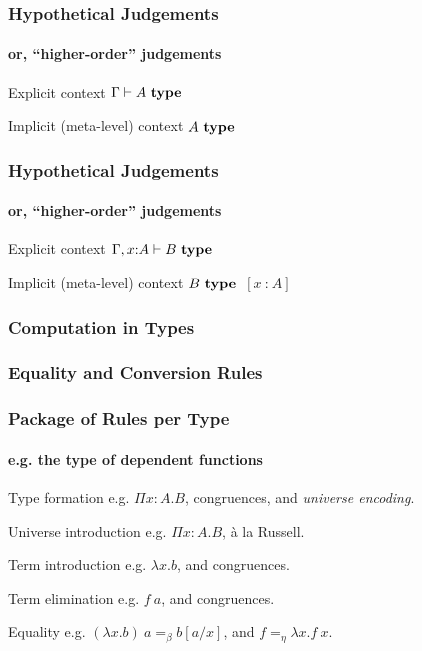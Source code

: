 \documentclass[mathserif]{beamer}
\newcommand{\istype}[1]{\ensuremath{#1 ~\textbf{\textrm{type}}}}
\newcommand{\isterm}[2]{\ensuremath{#1 ~\textbf{{:}}~ #2}}
\newcommand{\hyp}[1]{\ensuremath{~[\isterm{x}{#1}]}}
\newcommand{\Funv}[3]{\ensuremath{\Pi #1{:}#2. #3}}
\newcommand{\Fun}[2]{\Funv{x}{#1}{#2}}
\newcommand{\funv}[2]{\ensuremath{\lambda #1. #2}}
\newcommand{\fun}[1]{\funv{x}{#1}}
\newcommand{\app}[2]{\ensuremath{#1~#2}}
\newcommand{\sub}[2]{\ensuremath{#1[#2/x]}}
\begin{document}
\begin{frame}
\frametitle{Hypothetical Judgements}
\framesubtitle{or, ``higher-order'' judgements}

\begin{block}{Explicit context}
$\Gamma \vdash \istype{A}$
\end{block}

\begin{block}{Implicit (meta-level) context}
\istype{A}
\end{block}

\end{frame}

\begin{frame}
\frametitle{Hypothetical Judgements}
\framesubtitle{or, ``higher-order'' judgements}

\begin{block}{Explicit context}
$\Gamma, x{:}A \vdash \istype{B}$
\end{block}

\begin{block}{Implicit (meta-level) context}
\istype{B} \hyp{A}
\end{block}

\end{frame}

\begin{frame}
\frametitle{Computation in Types}


\end{frame}

\begin{frame}
\frametitle{Equality and Conversion Rules}

\end{frame}


\begin{frame}
\frametitle{Package of Rules per Type}
\framesubtitle{e.g. the type of dependent functions}

\begin{block}{Type formation}
e.g. \Fun{A}{B}, congruences, and \textit{universe encoding}.
\end{block}

\begin{block}{Universe introduction}
e.g. \Fun{A}{B}, {\`a} la Russell.
\end{block}

\begin{block}{Term introduction}
e.g. \fun{b}, and congruences.
\end{block}

\begin{block}{Term elimination}
e.g. \app{f}{a}, and congruences.
\end{block}

\begin{block}{Equality}
  e.g. $\app{(\fun{b})}{a} =_\beta \sub{b}{a}$, and
  $f =_\eta \fun{\app{f}{x}}$.
\end{block}

\end{frame}
\end{document}
